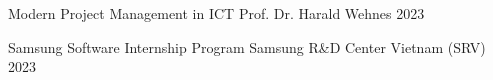 
\begin{cvhonors}

  \cvhonor
  {Modern Project Management in ICT} %
  {Prof.
    Dr.
    Harald Wehnes} %
  {} %
  {2023} %

  \cvhonor
  {Samsung Software Internship Program} %
  {Samsung R\&D Center Vietnam (SRV)} %
  {} %
  {2023} %

\end{cvhonors}
